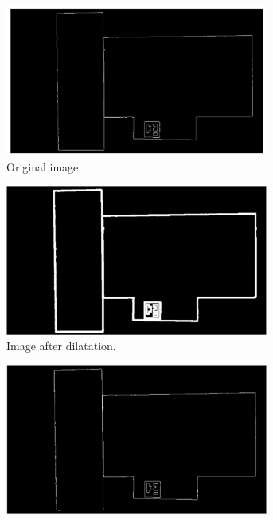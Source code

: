 \begin{figure}[!ht]
     \centering
     \begin{subfigure}[b]{0.325\linewidth}
         \centering
         \includegraphics[width=0.95\textwidth]{images/Development/chap4/original.jpg}
         \caption{Original image}
         \label{fig:imageProcessingExampleA}
     \end{subfigure}
     \hfill
     \begin{subfigure}[b]{0.325\linewidth}
         \centering
         \includegraphics[width=0.95\textwidth]{images/Development/chap4/after-dilatation.jpg}
         \caption{Image after dilatation.}
         \label{fig:imageProcessingExampleA}
     \end{subfigure}
     \hfill
     \begin{subfigure}[b]{0.325\linewidth}
         \centering
         \includegraphics[width=0.95\textwidth]{images/Development/chap4/after-erode.jpg}

\end{subfigure}
\end{figure}
